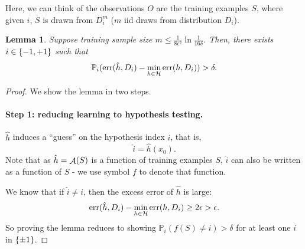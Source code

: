 \documentclass{article}
\newtheorem{lemma}{Lemma}
\DeclareMathOperator*{\err}{{\rm err}}
\DeclareMathOperator*{\Acal}{{\cal A}}
\newcommand{\PP}{\mathbb{P}}
\newcommand{\Hcal}{\mathcal{H}}
\begin{document}
Here, we can think of the observations $O$ are the training examples $S$, where given $i$, $S$ is drawn from $D_i^m$ ($m$ iid draws from distribution $D_i$).



\begin{lemma}
Suppose training sample size $m \leq \frac{1}{8\epsilon^2}\ln\frac1{16\delta}$.
Then, there exists $i \in \cbr{-1,+1}$ such that
\[ \PP_i(\err(\hat{h}, D_i) - \min_{h \in \Hcal} \err(h, D_i) ) > \delta. \]
\end{lemma}

\begin{proof}
We show the lemma in two steps.

\paragraph{Step 1: reducing learning to hypothesis testing.}
$\hat{h}$ induces a ``guess'' on the hypothesis index $i$, that is,
\[ \hat{i} = \hat{h}(x_0). \]
Note that as $\hat{h} = \Acal(S)$ is a function of training examples $S$, $\hat{i}$
can also be written as a function of $S$ - we use symbol $f$ to denote that function.

We know that if $\hat{i} \neq i$, then the excess error of $\hat{h}$ is large:
\[ \err(\hat{h}, D_i) - \min_{h \in \Hcal} \err(h, D_i) \geq 2\epsilon > \epsilon. \]
So proving the lemma reduces to showing $\PP_i(f(S) \neq i) > \delta$
for at least one $i$ in $\cbr{\pm 1}$.



\end{proof}
\end{document}
